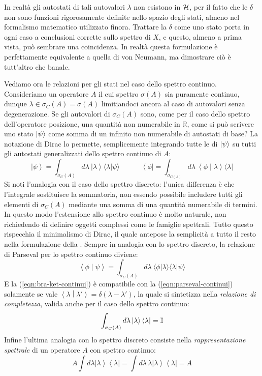 \documentclass[../../FisicaTeorica.tex]{subfiles}
\begin{document}
In realtà gli autostati di tali autovalori $\lambda$ non esistono in $\mathcal{H}$, per il fatto che le $\delta$ non sono funzioni rigorosamente definite nello spazio degli stati, almeno nel formalismo matematico utilizzato finora.
Trattare la $\delta$ come uno stato  porta in ogni caso a conclusioni corrette sullo spettro di $X$, e questo, almeno a prima vista, può sembrare una coincidenza. In realtà questa formulazione è perfettamente equivalente a quella di von Neumann, ma dimostrare ciò è tutt'altro che banale.

Vediamo ora le relazioni per gli stati nel caso dello spettro continuo. Consideriamo un operatore $A$ il cui spettro $\sigma(A)$ sia puramente continuo, dunque $\lambda \in \sigma_C\left(A\right)=\sigma (A)$
limitiandoci ancora al caso di autovalori senza degenerazione. Se gli autovalori  di $\sigma_C(A)$ sono, come per il caso dello spettro dell'operatore posizione, una quantità non numerabile in $\mathbb R$, come si può scrivere uno stato $\Ket\psi$ come somma di un infinito non numerabile di autostati  di base? La notazione di Dirac lo permette, semplicemente integrando tutte le  di $\Ket\psi$ su tutti gli autostati generalizzati dello spettro continuo di $A$:
\begin{equation}
\left|\psi\right\rangle= \int_{\sigma_C(A)}{d\lambda\ \left|\lambda\right\rangle\langle\lambda|\psi\rangle } \qquad \quad
\left\langle\phi\right|= \int_{\sigma_{C\left(A\right)}}{d\lambda\ \left\langle\phi\middle|\lambda\right\rangle\langle\lambda|}
\label{eqn:bra-ket-continui}
\end{equation}
Si noti l'analogia con il caso dello spettro discreto: l'unica differenza è che l'integrale sostituisce la sommatoria, non essendo possibile includere tutti gli elementi di $\sigma_C(A)$ mediante una somma di una quantità numerabile di termini. 
In questo modo l'estensione allo spettro continuo è molto naturale, non richiedendo di definire oggetti complessi come le famiglie spettrali. Tutto questo rispecchia il minimalismo di Dirac, il quale antepose la semplicità a tutto il resto nella formulazione della \MQ.
Sempre in analogia con lo spettro discreto, la relazione di Parseval per lo spettro continuo diviene:
\begin{equation}
\left\langle\phi\middle|\psi\right\rangle= \int_{\sigma_{C}\left(A\right)}{d\lambda\ \langle\phi|\lambda\rangle \langle\lambda|\psi\rangle }
    \label{eqn:parseval-continui}
\end{equation}
E la (\ref{eqn:bra-ket-continui}) è compatibile con la (\ref{eqn:parseval-continui}) solamente se vale $\left\langle\lambda\middle|\lambda'\right\rangle= \delta \left(\lambda-\lambda'\right)$, la quale si sintetizza nella \textit{relazione di completezza}, valida anche per il caso dello spettro continuo:
\[
\int_{\sigma_{C}\left(A\right)}{d\lambda\left|\lambda\right\rangle\left\langle\lambda\right|}=\mathbb{I}
\]
Infine l'ultima analogia con lo spettro discreto consiste nella \emph{rappresentazione spettrale} di un operatore $A$ con spettro continuo:
\[
A\int d\lambda  \left|\lambda\right\rangle\left\langle\lambda\right|=\int d\lambda\,\lambda \left|\lambda\right\rangle\left\langle\lambda\right|=A 
\]
\end{document}
